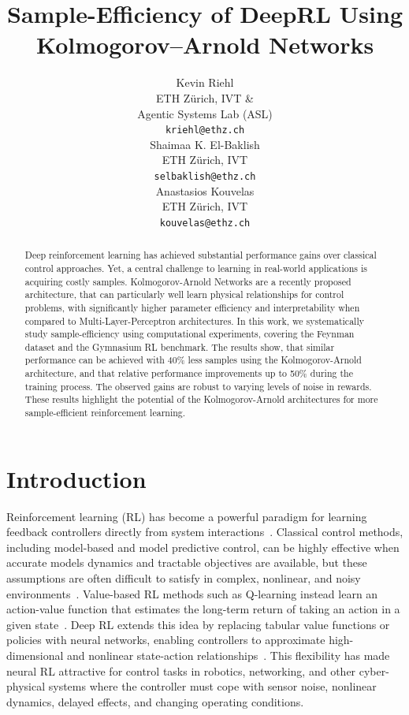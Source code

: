 \documentclass{article}
\title{Sample-Efficiency of DeepRL Using Kolmogorov–Arnold Networks}
\author{%
  Kevin Riehl \\
  ETH Zürich, IVT \& \\
  Agentic Systems Lab (ASL) \\
  \texttt{kriehl@ethz.ch} \\
  \And
  Shaimaa K. El-Baklish \\
  ETH Zürich, IVT \\
  \texttt{selbaklish@ethz.ch} \\
  \And
  Anastasios Kouvelas \\
  ETH Zürich, IVT \\
  \texttt{kouvelas@ethz.ch} \\
}
\begin{document}
\maketitle


\begin{abstract}
Deep reinforcement learning has achieved substantial performance gains over classical control approaches.
Yet, a central challenge to learning in real-world applications is acquiring costly samples.
Kolmogorov-Arnold Networks are a recently proposed architecture, that can particularly well learn physical relationships for control problems, with significantly higher parameter efficiency and interpretability when compared to Multi-Layer-Perceptron architectures.
In this work, we systematically study sample-efficiency using computational experiments, covering the Feynman dataset and the Gymnasium RL benchmark.
The results show, that similar performance can be achieved with 40\% less samples using the Kolmogorov-Arnold architecture, and that relative performance improvements up to 50\% during the training process.
The observed gains are robust to varying levels of noise in rewards.
These results highlight the potential of the Kolmogorov-Arnold architectures for more sample-efficient reinforcement learning.
\end{abstract}



\section{Introduction}

Reinforcement learning (RL) has become a powerful paradigm for learning feedback controllers directly from system interactions~\cite{sutton2018reinforcement}.
Classical control methods, including model-based and model predictive control, can be highly effective when accurate models dynamics and tractable objectives are available, but these assumptions are often difficult to satisfy in complex, nonlinear, and noisy environments~\cite{kiumarsi2017optimal}.
Value-based RL methods such as Q-learning instead learn an action-value function that estimates the long-term return of taking an action in a given state~\cite{watkins1992qlearning}.
Deep RL extends this idea by replacing tabular value functions or policies with neural networks, enabling controllers to approximate high-dimensional and nonlinear state-action relationships~\cite{mnih2015humanlevel,schulman2017ppo}.
This flexibility has made neural RL attractive for control tasks in robotics, networking, and other cyber-physical systems where the controller must cope with sensor noise, nonlinear dynamics, delayed effects, and changing operating conditions.
\end{document}
